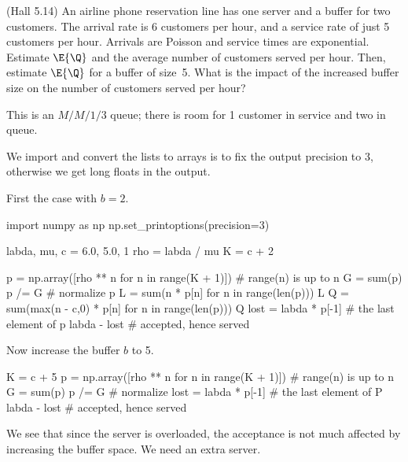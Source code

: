 \begin{exercise}
 (Hall 5.14) An airline phone reservation line has one server and a buffer for two customers.
 The arrival rate is 6 customers per hour, and a service rate of just 5 customers per hour.
 Arrivals are Poisson and service times are exponential.
 Estimate $\E{\Q}$ and the average number of customers served per hour.
 Then, estimate $\E{\Q}$ for a buffer of size~5.
 What is the impact of the increased buffer size on the number of customers served per hour?
\begin{hint}
This is an $M/M/1/3$ queue; there is room for 1 customer in service and two in queue.
\end{hint}
\begin{solution}
We import  and convert the lists to arrays is to fix the output precision to 3, otherwise we get long floats in the output.

First the case with $b=2$.
\begin{pyconsole}
import numpy as np
np.set_printoptions(precision=3)

labda, mu, c = 6.0,  5.0, 1
rho = labda / mu
K = c + 2


p = np.array([rho ** n for n in range(K + 1)]) # range(n) is up to n
G = sum(p)
p /= G  # normalize
p
L = sum(n * p[n] for n in range(len(p)))
L
Q = sum(max(n - c,0) * p[n] for n in range(len(p)))
Q
lost = labda * p[-1]  # the last element of p
labda - lost # accepted, hence served
\end{pyconsole}

Now increase the buffer $b$ to 5.

\begin{pyconsole}
K = c + 5
p = np.array([rho ** n for n in range(K + 1)]) # range(n) is up to n
G = sum(p)
p /= G  # normalize
lost = labda * p[-1]  # the last element of P
labda - lost # accepted, hence served
\end{pyconsole}
We see that since the server is overloaded, the acceptance is not much affected by increasing the buffer space.
We need an extra server.
\end{solution}
\end{exercise}


